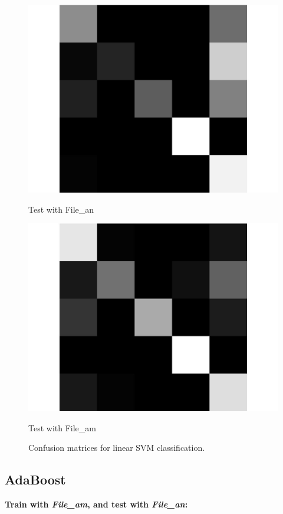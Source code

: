 \documentclass[letterpaper]{article}
\begin{document}
\begin{figure}
\begin{minipage}{.45\linewidth}
   \includegraphics[width=\linewidth]{confusionmatrices/confusionSVMQ1_1.png}
   \small\centerline{Test with File\_an}\normalsize
   \end{minipage}
\begin{minipage}{.45\linewidth}
   \includegraphics[width=\linewidth]{confusionmatrices/confusionSVMQ1_2.png}
   \small\centerline{Test with File\_am}\normalsize
   \end{minipage}
   \caption{Confusion matrices for linear SVM classification.}
\end{figure}


\subsection*{AdaBoost}
\textbf{Train with \textit{File\_am}, and test with \textit{File\_an}:}
\end{document}
